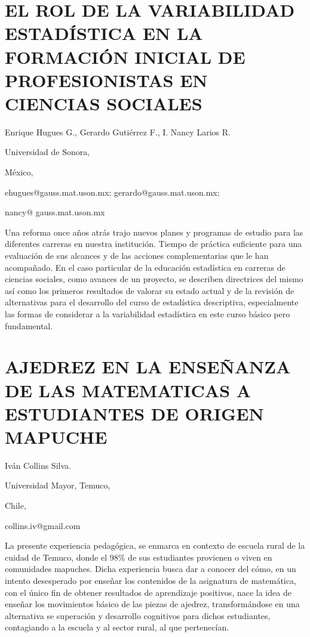 \section{EL ROL DE LA VARIABILIDAD ESTADÍSTICA EN LA FORMACIÓN INICIAL DE
PROFESIONISTAS EN CIENCIAS SOCIALES }

\begin{datos}

Enrique Hugues G., Gerardo Gutiérrez F., I. Nancy Larios R.

Universidad de Sonora,

México,

ehugues@gauss.mat.uson.mx; gerardo@gauss.mat.uson.mx;

nancy@ gauss.mat.uson.mx

\end{datos}

Una reforma once años atrás trajo nuevos planes y programas de estudio
para las diferentes carreras en nuestra institución. Tiempo de práctica
suficiente para una evaluación de sus alcances y de las acciones complementarias
que le han acompañado. En el caso particular de la educación estadística
en carreras de ciencias sociales, como avances de un proyecto, se
describen directrices del mismo así como los primeros resultados de
valorar su estado actual y de la revisión de alternativas para el
desarrollo del curso de estadística descriptiva, especialmente las
formas de considerar a la variabilidad estadística en este curso básico
pero fundamental. 


\section{AJEDREZ EN LA ENSEÑANZA DE LAS MATEMATICAS A ESTUDIANTES DE ORIGEN
MAPUCHE}

\begin{datos}

Iván Collins Silva.

Universidad Mayor, Temuco, 

Chile,

collins.iv@gmail.com 

\end{datos}

La presente experiencia pedagógica, se enmarca en contexto de escuela
rural de la cuidad de Temuco, donde el 98\% de sus estudiantes provienen
o viven en comunidades mapuches. Dicha experiencia busca dar a conocer
del cómo, en un intento desesperado por enseñar los contenidos de
la asignatura de matemática, con el único fin de obtener resultados
de aprendizaje positivos, nace la idea de enseñar los movimientos
básico de las piezas de ajedrez, transformándose en una alternativa
se superación y desarrollo cognitivos para dichos estudiantes, contagiando
a la escuela y al sector rural, al que pertenecían.



